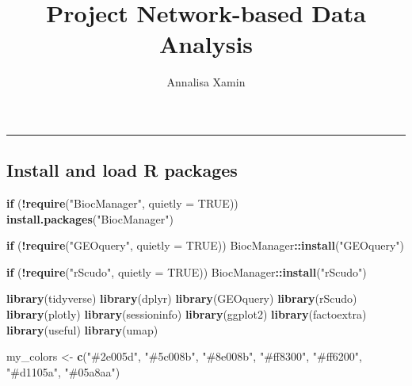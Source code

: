 \documentclass[
]{article}
\title{Project Network-based Data Analysis}
\author{Annalisa Xamin}
\date{}
\newenvironment{Shaded}{\begin{snugshade}}{\end{snugshade}}
\newcommand{\AttributeTok}[1]{\textcolor[rgb]{0.13,0.29,0.53}{#1}}
\newcommand{\ConstantTok}[1]{\textcolor[rgb]{0.56,0.35,0.01}{#1}}
\newcommand{\ControlFlowTok}[1]{\textcolor[rgb]{0.13,0.29,0.53}{\textbf{#1}}}
\newcommand{\FunctionTok}[1]{\textcolor[rgb]{0.13,0.29,0.53}{\textbf{#1}}}
\newcommand{\NormalTok}[1]{#1}
\newcommand{\OtherTok}[1]{\textcolor[rgb]{0.56,0.35,0.01}{#1}}
\newcommand{\SpecialCharTok}[1]{\textcolor[rgb]{0.81,0.36,0.00}{\textbf{#1}}}
\newcommand{\StringTok}[1]{\textcolor[rgb]{0.31,0.60,0.02}{#1}}
\begin{document}
\maketitle

{
\setcounter{tocdepth}{2}
\tableofcontents
}
\begin{center}\rule{0.5\linewidth}{0.5pt}\end{center}

\subsection{Install and load R
packages}\label{install-and-load-r-packages}

\begin{Shaded}
\begin{Highlighting}[]
\ControlFlowTok{if}\NormalTok{ (}\SpecialCharTok{!}\FunctionTok{require}\NormalTok{(}\StringTok{"BiocManager"}\NormalTok{, }\AttributeTok{quietly =} \ConstantTok{TRUE}\NormalTok{))}
    \FunctionTok{install.packages}\NormalTok{(}\StringTok{"BiocManager"}\NormalTok{)}

\ControlFlowTok{if}\NormalTok{ (}\SpecialCharTok{!}\FunctionTok{require}\NormalTok{(}\StringTok{"GEOquery"}\NormalTok{, }\AttributeTok{quietly =} \ConstantTok{TRUE}\NormalTok{))}
\NormalTok{    BiocManager}\SpecialCharTok{::}\FunctionTok{install}\NormalTok{(}\StringTok{"GEOquery"}\NormalTok{) }

\ControlFlowTok{if}\NormalTok{ (}\SpecialCharTok{!}\FunctionTok{require}\NormalTok{(}\StringTok{"rScudo"}\NormalTok{, }\AttributeTok{quietly =} \ConstantTok{TRUE}\NormalTok{))}
\NormalTok{    BiocManager}\SpecialCharTok{::}\FunctionTok{install}\NormalTok{(}\StringTok{"rScudo"}\NormalTok{) }

\FunctionTok{library}\NormalTok{(tidyverse)}
\FunctionTok{library}\NormalTok{(dplyr)}
\FunctionTok{library}\NormalTok{(GEOquery)}
\FunctionTok{library}\NormalTok{(rScudo)}
\FunctionTok{library}\NormalTok{(plotly)}
\FunctionTok{library}\NormalTok{(sessioninfo)}
\FunctionTok{library}\NormalTok{(ggplot2)}
\FunctionTok{library}\NormalTok{(factoextra)}
\FunctionTok{library}\NormalTok{(useful)}
\FunctionTok{library}\NormalTok{(umap)}

\NormalTok{my\_colors }\OtherTok{\textless{}{-}} \FunctionTok{c}\NormalTok{(}\StringTok{"\#2e005d"}\NormalTok{, }\StringTok{"\#5c008b"}\NormalTok{, }\StringTok{"\#8e008b"}\NormalTok{, }\StringTok{"\#ff8300"}\NormalTok{, }\StringTok{"\#ff6200"}\NormalTok{, }\StringTok{"\#d1105a"}\NormalTok{, }\StringTok{"\#05a8aa"}\NormalTok{)}
\end{Highlighting}
\end{Shaded}
\end{document}
